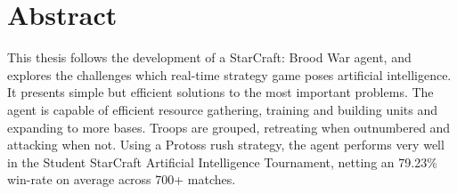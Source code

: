 \chapter{Abstract}
This thesis follows the development of a StarCraft: Brood War agent, and explores the challenges which real-time strategy game poses artificial intelligence. It presents simple but efficient solutions to the most important problems. The agent is capable of efficient resource gathering, training and building units and expanding to more bases. Troops are grouped, retreating when outnumbered and attacking when not. Using a Protoss rush strategy, the agent performs very well in the Student StarCraft Artificial Intelligence Tournament, netting an 79.23\% win-rate on average across 700+ matches.